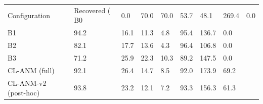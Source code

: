 \begin{tabular}{llllllll}
\toprule
Configuration & Recovered (%
\midrule
B0 & 0.0 & 70.0 & 70.0 & 53.7 & 48.1 & 269.4 & 0.0 \\
B1 & 94.2 & 16.1 & 11.3 & 4.8 & 95.4 & 136.7 & 0.0 \\
B2 & 82.1 & 17.7 & 13.6 & 4.3 & 96.4 & 106.8 & 0.0 \\
B3 & 71.2 & 25.9 & 22.3 & 10.3 & 89.2 & 147.5 & 0.0 \\
CL-ANM (full) & 92.1 & 26.4 & 14.7 & 8.5 & 92.0 & 173.9 & 69.2 \\
CL-ANM-v2 (post-hoc) & 93.8 & 23.2 & 12.1 & 7.2 & 93.3 & 156.3 & 61.3 \\
\bottomrule
\end{tabular}
